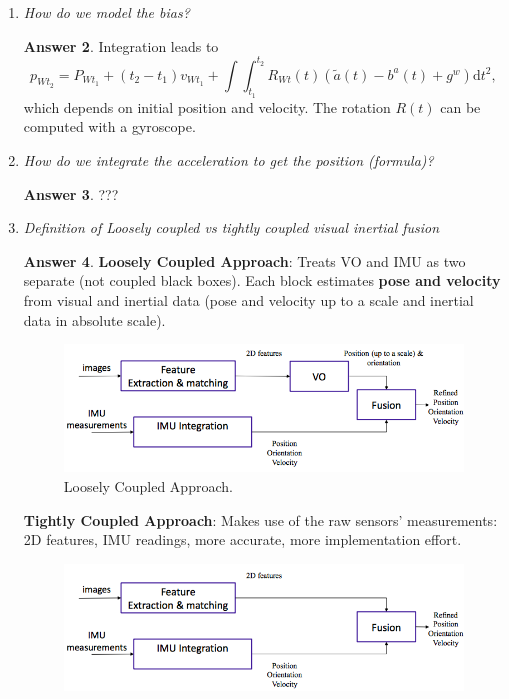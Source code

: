 \documentclass[a4paper,12 pt]{article}
\theoremstyle{definition}
\theoremstyle{remark}
\theoremstyle{definition}
\theoremstyle{definition}
\theoremstyle{definition}
\theoremstyle{definition}
\theoremstyle{remark}
\theoremstyle{remark}
\theoremstyle{definition}
\theoremstyle{definition}
\newtheorem*{answer}{Answer}
\begin{document}
\begin{enumerate}
\begin{answer}
\end{answer}
\item \textit{How do we model the bias? }
\begin{answer}
Integration leads to
\begin{equation}
p_{Wt_2}=P_{Wt_1}+(t_2-t_1)v_{Wt_1}+\int \int_{t_1}^{t_2}R_{Wt}(t)\left( \tilde{a}(t)-b^a(t)+g^w \right)\text{d}t^2,
\end{equation}
which depends on initial position and velocity. The rotation $R(t)$ can be computed with a gyroscope.
\end{answer}
\item \textit{How do we integrate the acceleration to get the position (formula)? }
\begin{answer}
???
\end{answer}
\item \textit{Definition of Loosely coupled vs tightly coupled visual inertial fusion}
\begin{answer}
\textbf{Loosely Coupled Approach}: 
Treats VO and IMU as two separate (not coupled black boxes). Each block estimates \textbf{pose and velocity} from visual and inertial data (pose and velocity up to a scale and inertial data in absolute scale).
\begin{figure}[h]
\begin{center}
\includegraphics[scale=0.6]{pics/loos}
\caption{Loosely Coupled Approach.}
\end{center}
\end{figure}
\textbf{Tightly Coupled Approach}: 
Makes use of the raw sensors' measurements: 2D features, IMU readings, more accurate, more implementation effort.
\begin{figure}[h]
\begin{center}
\includegraphics[scale=0.6]{pics/tight}

\end{center}
\end{figure}
\end{answer}
\end{enumerate}
\end{document}
